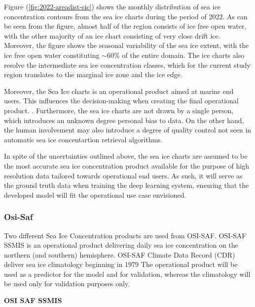 \documentclass[../main/thesis.tex]{subfiles}
\begin{document}
Figure (\ref{fig:2022-areadist-sic}) shows the monthly distribution of sea ice concentration contours from the sea ice charts during the period of 2022. As can be seen from the figure, almost half of the region consists of ice free open water, with the other majority of an ice chart consisting of very close drift ice. Moreover, the figure shows the seasonal variability of the sea ice extent, with the ice free open water constituting $\sim60$\% of the entire domain. The ice charts also resolve the intermediate sea ice concentration classes, which for the current study region translates to the marginal ice zone and the ice edge. 

\begin{figure}
\end{figure}

Moreover, the Sea Ice charts is an operational product aimed at marine end users. This influences the decision-making when creating the final operational product. . Furthermore, the sea ice charts are not drawn by a single person, which introduces an unknown degree personal bias to data. On the other hand, the human involvement may also introduce a degree of quality control not seen in automatic sea ice concentartion retrieval algorithms.

In spite of the uncertainties outlined above, the sea ice charts are assumed to be the most accurate sea ice concentration product available for the purpose of high resolution data tailored towards operational end users. As such, it will serve as the ground truth data when training the deep learning system, ensuring that the developed model will fit the operational use case  envisioned.


\subsubsection{Osi-Saf}
Two different Sea Ice Concentration products are used from OSI-SAF. OSI-SAF SSMIS is an operational product delivering daily sea ice concentration on the northern (and southern) hemisphere. OSI-SAF Climate Data Record (CDR) \citep{Soerensen2021} deliver sea ice climatology beginning in 1979 \citep{Lavergne2019} The operational product will be used as a predictor for the model and for validation, whereas the climatology will be used only for validation purposes only. 

\textbf{OSI SAF SSMIS}
\end{document}
